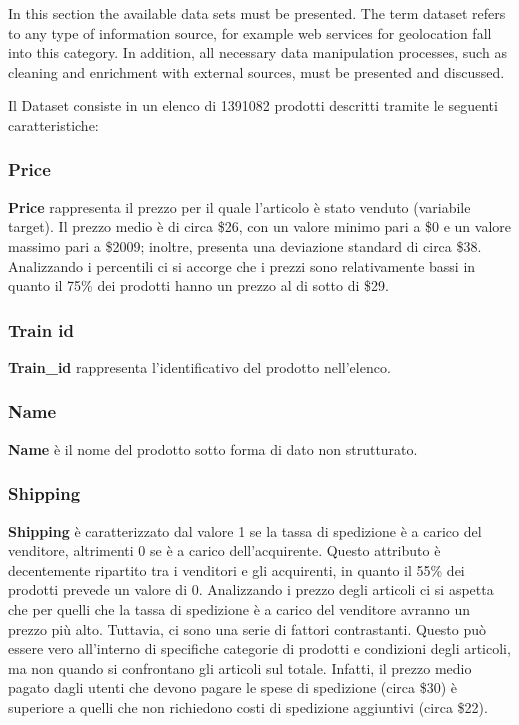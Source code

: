 In this section the available data sets must be presented. The term dataset refers to any type of information source, for example web services for geolocation fall into this category. 
In addition, all necessary data manipulation processes, such as cleaning and enrichment with external sources, must be presented and discussed.



Il Dataset consiste in un elenco di 1391082 prodotti descritti tramite le seguenti caratteristiche:
\subsubsection{Price}
\textbf{Price} rappresenta il prezzo per il quale l'articolo è stato venduto (variabile target).
Il prezzo medio è di circa \$26, con un valore minimo pari a \$0 e un valore massimo pari a \$2009; inoltre, presenta una deviazione standard di circa \$38.
Analizzando i percentili ci si accorge che i prezzi sono relativamente bassi in quanto il 75\% dei prodotti hanno un prezzo al di sotto di \$29.
\subsubsection{Train id}
\textbf{Train\_id} rappresenta l'identificativo del prodotto nell'elenco.
\subsubsection{Name}
\textbf{Name} è il nome del prodotto sotto forma di dato non strutturato.
\subsubsection{Shipping}
\textbf{Shipping} è caratterizzato dal valore 1 se la tassa di spedizione è a carico del venditore, altrimenti 0 se è a carico dell'acquirente.
Questo attributo è decentemente ripartito tra i venditori e gli acquirenti, in quanto il 55\% dei prodotti prevede un valore di 0.
Analizzando i prezzo degli articoli ci si aspetta che per quelli che la tassa di spedizione è a carico del venditore avranno un prezzo più alto. Tuttavia, ci sono una serie di fattori contrastanti. Questo può essere vero all'interno di specifiche categorie di prodotti e condizioni degli articoli, ma non quando si confrontano gli articoli sul totale. 
Infatti, il prezzo medio pagato dagli utenti che devono pagare le spese di spedizione (circa \$30) è superiore a quelli che non richiedono costi di spedizione aggiuntivi (circa \$22).
